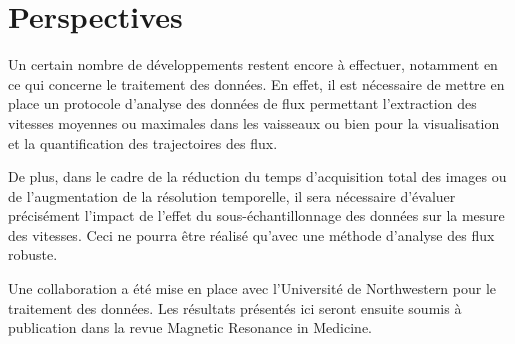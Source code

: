 \section{Perspectives}

Un certain nombre de développements restent encore à effectuer, notamment en ce qui concerne le traitement des données. En effet, il est nécessaire de mettre en place un protocole d’analyse des données de flux permettant l’extraction des vitesses moyennes ou maximales dans les vaisseaux ou bien pour la visualisation et la quantification des trajectoires des flux.

De plus, dans le cadre de la réduction du temps d’acquisition total des images ou de l’augmentation de la résolution temporelle, il sera nécessaire d’évaluer précisément l’impact de l’effet du sous-échantillonnage des données sur la mesure des vitesses. Ceci ne pourra être réalisé qu’avec une méthode d’analyse des flux robuste. 

Une collaboration a été mise en place avec l’Université de Northwestern pour le traitement des données. Les résultats présentés ici seront ensuite soumis à publication dans la revue Magnetic Resonance in Medicine.
